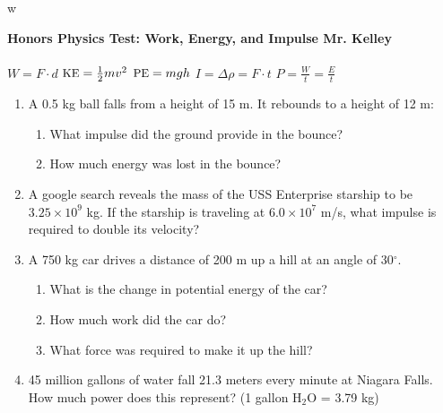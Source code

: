 w\documentclass[12pt]{report}
\newcommand{\ke}{\mbox{\small KE}}
\newcommand{\pe}{\mbox{\small PE}}
\begin{document}
{\bf{Honors Physics} \hfill {Test: Work, Energy, and Impulse} \hfill {Mr. Kelley}} \\ \\
\mbox{} \hfill $W=F\cdot d$ \hfill $\ke = \frac{1}{2}mv^2$ \hfill $\pe = mgh$ \hfill $I = \Delta \rho = F\cdot t$ \hfill $P = \frac{W}{t}=\frac{E}{t}$ \hfill \mbox{}
\begin{center}
\end{center}
\begin{enumerate}
\item A 0.5 kg ball falls from a height of 15 m.  It rebounds to a height of 12 m:
\begin{enumerate}
\item What impulse did the ground provide in the bounce?
\vfill
\item How much energy was lost in the bounce?
\end{enumerate}
\vfill
\item A google search reveals the mass of the USS Enterprise starship to be $3.25 \times 10^9$ kg.  If the starship is traveling at $6.0 \times 10^7$ m/s, what impulse is required to double its velocity?
\vspace{8cm}
\pagebreak
\item A 750 kg car drives a distance of 200 m up a hill at an angle of 30$^\circ$.
\begin{enumerate}
\item What is the change in potential energy of the car?
\item How much work did the car do?
\item What force was required to make it up the hill?
\end{enumerate}
\vfill
\item 45 million gallons of water fall 21.3 meters every minute at Niagara Falls.  How much power does this represent? (1 gallon H$_2$O = 3.79 kg)
\vfill
\end{enumerate}
\end{document}
